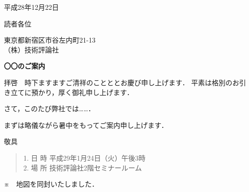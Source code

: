 \documentclass[a4paper,12pt]{ltjsarticle}
\begin{document}
\begin{flushright}
    平成28年12月22日
\end{flushright}

\begin{flushright}
    読者各位
\end{flushright}

\begin{flushright}
    東京都新宿区市谷左内町21-13 \\
    （株）技術評論社
\end{flushright}

\begin{center}
    \HUGE\bfseries 〇〇のご案内
\end{center}

\vspace{3.\baselineskip}

\noindent
拝啓　時下ますますご清祥のことととお慶び申し上げます．
平素は格別のお引き立てに預かり，厚く御礼申し上げます．

さて，このたび弊社では……．

まずは略儀ながら暑中をもってご案内申し上げます．

\begin{flushright}
    敬具
\end{flushright}

\begin{center}
\end{center}

\begin{quote}
    1. 日 時    平成29年1月24日（火）午後3時 \\
    2. 場 所    技術評論社2階セミナールーム
\end{quote}

※　地図を同封いたしました．
\end{document}

